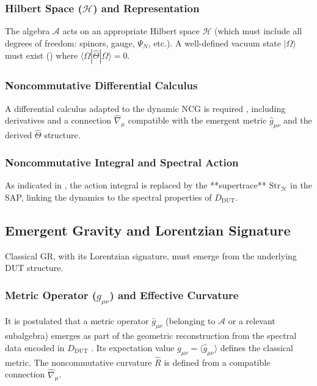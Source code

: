 \documentclass[11pt, a4paper]{article}
\theoremstyle{remark}
\newcommand{\Op}[1]{\hat{#1}}
\newcommand{\Str}{\mathrm{Str}}
\begin{document}
\subsubsection{Hilbert Space (\texorpdfstring{$\mathcal{H}$}{H}) and Representation}
\label{ssubsec:hilbert_space_final}
The algebra \( \mathcal{A} \) acts on an appropriate Hilbert space \( \mathcal{H} \) (which must include all degrees of freedom: spinors, gauge, \( \Psi_N \), etc.). A well-defined vacuum state \( |\Omega\rangle \) must exist () where \( \langle\Omega|\Op{\Theta}|\Omega\rangle = 0 \).

\subsubsection{Noncommutative Differential Calculus}
\label{ssubsec:calculus_final}
A differential calculus adapted to the dynamic NCG is required \citep{GraciaBondia2001NCG, Madore1995, DuboisViolette2001Derivations}, including derivatives and a connection \( \hat{\nabla}_\mu \) compatible with the emergent metric \( \hat{g}_{\mu\nu} \) and the derived \( \Op{\Theta} \) structure.

\subsubsection{Noncommutative Integral and Spectral Action}
\label{ssubsec:integral_nc_final}
As indicated in , the action integral is replaced by the **supertrace** \( \Str_{\mathcal{H}} \) in the SAP, linking the dynamics to the spectral properties of \( D_{\text{DUT}} \).

\subsection{Emergent Gravity and Lorentzian Signature}
\label{subsec:emergent_gravity_signature}

Classical GR, with its Lorentzian signature, must emerge from the underlying DUT structure.

\subsubsection{Metric Operator (\texorpdfstring{$\hat{g}_{\mu\nu}$}{g}) and Effective Curvature}
\label{ssubsec:metric_op_final}
It is postulated that a metric operator \( \hat{g}_{\mu\nu} \) (belonging to \( \mathcal{A} \) or a relevant subalgebra) emerges as part of the geometric reconstruction from the spectral data encoded in \( D_{\text{DUT}} \) \citep{Connes1994}. Its expectation value \( g_{\mu\nu} = \langle \hat{g}_{\mu\nu} \rangle \) defines the classical metric. The noncommutative curvature \( \hat{R} \) is defined from a compatible connection \( \hat{\nabla}_\mu \).
\end{document}
